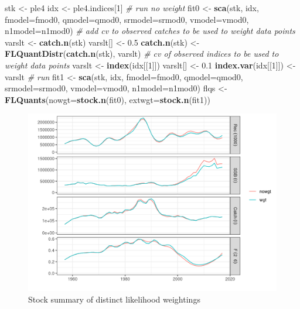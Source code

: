 \documentclass[
]{book}
\newenvironment{Shaded}{\begin{snugshade}}{\end{snugshade}}
\newcommand{\AttributeTok}[1]{\textcolor[rgb]{0.13,0.29,0.53}{#1}}
\newcommand{\CommentTok}[1]{\textcolor[rgb]{0.56,0.35,0.01}{\textit{#1}}}
\newcommand{\DecValTok}[1]{\textcolor[rgb]{0.00,0.00,0.81}{#1}}
\newcommand{\FloatTok}[1]{\textcolor[rgb]{0.00,0.00,0.81}{#1}}
\newcommand{\FunctionTok}[1]{\textcolor[rgb]{0.13,0.29,0.53}{\textbf{#1}}}
\newcommand{\NormalTok}[1]{#1}
\newcommand{\OtherTok}[1]{\textcolor[rgb]{0.56,0.35,0.01}{#1}}
\begin{document}
\begin{Shaded}
\begin{Highlighting}[]
\NormalTok{stk }\OtherTok{\textless{}{-}}\NormalTok{ ple4}
\NormalTok{idx }\OtherTok{\textless{}{-}}\NormalTok{ ple4.indices[}\DecValTok{1}\NormalTok{]}
\CommentTok{\# run no weight}
\NormalTok{fit0 }\OtherTok{\textless{}{-}} \FunctionTok{sca}\NormalTok{(stk, idx, }\AttributeTok{fmodel=}\NormalTok{fmod0, }\AttributeTok{qmodel=}\NormalTok{qmod0, }\AttributeTok{srmodel=}\NormalTok{srmod0,}
       \AttributeTok{vmodel=}\NormalTok{vmod0, }\AttributeTok{n1model=}\NormalTok{n1mod0)}
\CommentTok{\# add cv to observed catches to be used to weight data points}
\NormalTok{varslt }\OtherTok{\textless{}{-}} \FunctionTok{catch.n}\NormalTok{(stk)}
\NormalTok{varslt[] }\OtherTok{\textless{}{-}} \FloatTok{0.5}
\FunctionTok{catch.n}\NormalTok{(stk) }\OtherTok{\textless{}{-}} \FunctionTok{FLQuantDistr}\NormalTok{(}\FunctionTok{catch.n}\NormalTok{(stk), varslt)}
\CommentTok{\# cv of observed indices to be used to weight data points}
\NormalTok{varslt }\OtherTok{\textless{}{-}} \FunctionTok{index}\NormalTok{(idx[[}\DecValTok{1}\NormalTok{]])}
\NormalTok{varslt[] }\OtherTok{\textless{}{-}} \FloatTok{0.1}
\FunctionTok{index.var}\NormalTok{(idx[[}\DecValTok{1}\NormalTok{]]) }\OtherTok{\textless{}{-}}\NormalTok{ varslt}
\CommentTok{\# run}
\NormalTok{fit1 }\OtherTok{\textless{}{-}} \FunctionTok{sca}\NormalTok{(stk, idx, }\AttributeTok{fmodel=}\NormalTok{fmod0, }\AttributeTok{qmodel=}\NormalTok{qmod0, }\AttributeTok{srmodel=}\NormalTok{srmod0,}
       \AttributeTok{vmodel=}\NormalTok{vmod0, }\AttributeTok{n1model=}\NormalTok{n1mod0)}
\NormalTok{flqs }\OtherTok{\textless{}{-}} \FunctionTok{FLQuants}\NormalTok{(}\AttributeTok{nowgt=}\FunctionTok{stock.n}\NormalTok{(fit0), }\AttributeTok{extwgt=}\FunctionTok{stock.n}\NormalTok{(fit1))}
\end{Highlighting}
\end{Shaded}

\begin{figure}
\centering
\includegraphics{_bookdown_files/_main_files/figure-html/likwgt-1.png}
\caption{\label{fig:likwgt}Stock summary of distinct likelihood weightings}
\end{figure}
\end{document}
